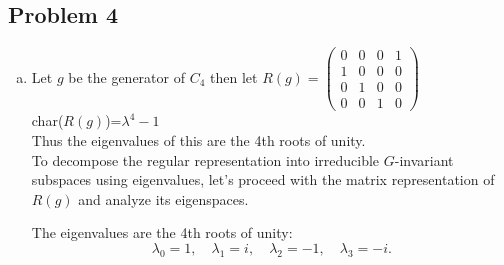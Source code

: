 \documentclass[12pt, letterpaper]{article}
\theoremstyle{definition}
\begin{document}
\subsection*{Problem 4}
\begin{enumerate}[(a)]
    \item Let $g$ be the generator of $C_4$ then let $R(g)=\begin{pmatrix}
        0 & 0 & 0 & 1\\
        1 & 0 & 0 & 0\\
        0 & 1 & 0 & 0\\
        0 & 0 & 1 & 0
    \end{pmatrix}$\\
    char($R(g)$)=$\lambda^4-1$\\
    Thus the eigenvalues of this are the 4th roots of unity.\\
    To decompose the regular representation into irreducible \( G \)-invariant subspaces using eigenvalues, let's proceed with the matrix representation of \( R(g) \) and analyze its eigenspaces.

The eigenvalues are the 4th roots of unity:
\[
\lambda_0 = 1, \quad \lambda_1 = i, \quad \lambda_2 = -1, \quad \lambda_3 = -i.
\]


\end{enumerate}
\end{document}
